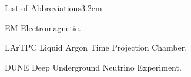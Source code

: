 \begin{mclistof}{List of Abbreviations}{3.2cm}

\item[EM] Electromagnetic.

\item[LArTPC] Liquid Argon Time Projection Chamber.

\item[DUNE] Deep Underground Neutrino Experiment.

\end{mclistof} 
